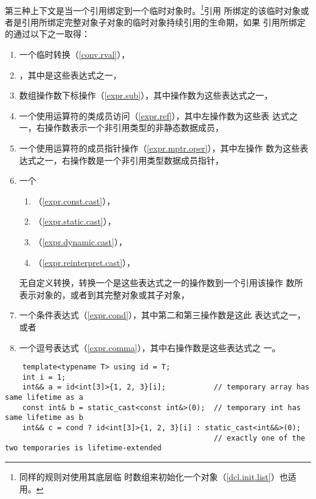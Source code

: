 \paragraph{} %
第三种上下文是当一个引用绑定到一个临时对象时。\footnote{同样的规则对使用其底层临
时数组来初始化一个对象（\ref{dcl.init.list}）也适用。}引用
所绑定的该临时对象或者是引用所绑定完整对象子对象的临时对象持续引用的生命期，如果
引用所绑定的\prvalue{}通过以下之一取得：
\begin{enumerate}
  \item 一个临时\mat{}转换（\ref{conv.rval}），
  \item \tm{(}  \tm{)}，其中是这些表达式之一，
  \item 数组操作数下标操作（\ref{expr.sub}），其中操作数为这些表达式之一，
  \item 一个使用运算符的类成员访问（\ref{expr.ref}），其中左操作数为这些表
        达式之一，右操作数表示一个非引用类型的非静态数据成员，
  \item 一个使用运算符的成员指针操作（\ref{expr.mptr.oper}），其中左操作
        数为这些表达式之一，右操作数是一个非引用类型数据成员指针，
  \item 一个
        \begin{enumerate}
          \item {}（\ref{expr.const.cast}），
          \item {}（\ref{expr.static.cast}），
          \item {}（\ref{expr.dynamic.cast}），
          \item {}（\ref{expr.reinterpret.cast}），
        \end{enumerate}
        无自定义转换，转换一个是这些表达式之一的\glvalue{}操作数到一个引用该操作
        数所表示对象的\glvalue{}，或者到其完整对象或其子对象，
  \item 一个\glvalue{}条件表达式（\ref{expr.cond}），其中第二和第三操作数是这此
        表达式之一，或者
  \item 一个\glvalue{}逗号表达式（\ref{expr.comma}），其中右操作数是这些表达式之
        一。
\end{enumerate}

\begin{example}
  \begin{lstlisting}
    template<typename T> using id = T;
    int i = 1;
    int&& a = id<int[3]>{1, 2, 3}[i];           // temporary array has same lifetime as a
    const int& b = static_cast<const int&>(0);  // temporary int has same lifetime as b
    int&& c = cond ? id<int[3]>{1, 2, 3}[i] : static_cast<int&&>(0);
                                                // exactly one of the two temporaries is lifetime-extended
  \end{lstlisting}
\end{example}

